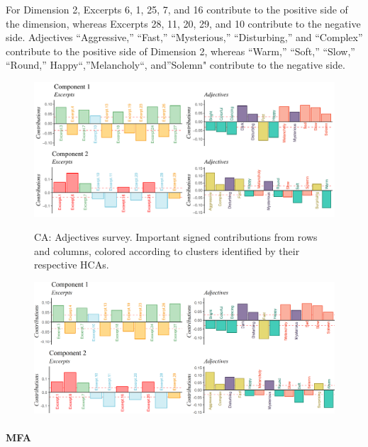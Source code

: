 \documentclass[
  english,
  man,floatsintext]{apa6}
\let\oldparagraph\paragraph
\renewcommand{\paragraph}[1]{\oldparagraph{#1}\mbox{}}
\begin{document}
For Dimension 2, Excerpts 6, 1, 25, 7, and 16 contribute to the positive side of the dimension, whereas Excerpts 28, 11, 20, 29, and 10 contribute to the negative side. Adjectives ``Aggressive,'' ``Fast,'' ``Mysterious,'' ``Disturbing,'' and ``Complex'' contribute to the positive side of Dimension 2, whereas ``Warm,'' ``Soft,'' ``Slow,'' ``Round,'' Happy``,''Melancholy``, and''Solemn" contribute to the negative side.

\begin{figure}

{\centering \includegraphics{Music-Descriptor-Space_files/figure-latex/contributionsAcode-1} 

}

\caption{ }\label{fig:contributionsAcode}
\end{figure}

\begin{figure}   
  \centering  
  \caption{CA: Adjectives survey. Important signed contributions from rows and columns, colored according to clusters identified by their respective HCAs.}
    \includegraphics{./Music-Descriptor-Space_files/figure-latex/contributionsAcode-1.png}
  \label{fig:contributionsA}
  \caption*{}
\end{figure}

\hypertarget{mfa}{%
\paragraph{MFA}\label{mfa}}
\end{document}
